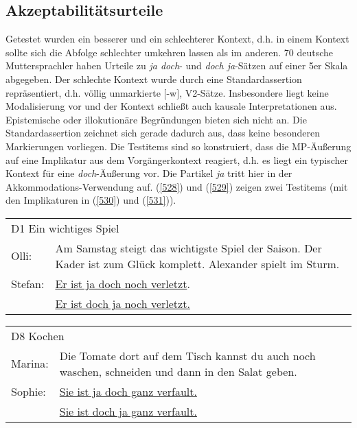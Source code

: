 \subsection{Akzeptabilitätsurteile}
\label{sec:akz}
Getestet wurden ein \glq besserer\grq {} und ein \glq schlechterer\grq {} Kontext, d.h. in einem Kontext sollte sich die Abfolge schlechter umkehren lassen als im anderen. 70 deutsche Muttersprachler haben Urteile zu \textit{ja doch}- und \textit{doch ja}-Sätzen auf einer 5er Skala abgegeben. Der \glq schlechte\grq {} Kontext wurde durch eine Standardassertion  repräsentiert, d.h. völlig unmarkierte $[$-w$]$, V2-Sätze. Insbesondere liegt keine Modalisierung vor und der Kontext schließt auch kausale Interpretationen aus. Epistemische oder illokutionäre Begründungen   bieten sich nicht an. Die Standardassertion zeichnet sich gerade dadurch aus, dass keine besonderen Markierungen vorliegen. Die Testitems sind so konstruiert, dass die MP-Äußerung auf eine Implikatur  aus dem Vorgängerkontext reagiert, d.h. es liegt ein typischer Kontext für eine \textit{doch}-Äußerung vor. Die Partikel \textit{ja} tritt hier in der Akkommoda\-tions-Verwendung  auf. (\ref{528}) und (\ref{529}) zeigen zwei Testitems (mit den Implikaturen in (\ref{530}) und (\ref{531})).

\begin{exe}
	\ex\label{528} 
	\begin{tabular}[t]{p{2em} p{25em}}
	\multicolumn{2}{l}{D1 Ein wichtiges Spiel}\\
    Olli: & Am Samstag steigt das wichtigste Spiel der Saison. Der Kader ist zum Glück komplett. Alexander spielt im Sturm.\\
	Stefan: & \underline{Er ist ja doch noch verletzt}.\\
	& \underline{Er ist doch ja noch verletzt.} \\		
    \end{tabular}
\end{exe}

\begin{exe}
	\ex\label{529} 
	\begin{tabular}[t]{p{3em} p{25em}}
	\multicolumn{2}{l}{D8 Kochen}\\
    Marina: & Die Tomate dort auf dem Tisch kannst du auch noch waschen, schneiden und dann in den Salat geben.\\
	Sophie: & \underline{Sie ist ja doch ganz verfault.}\\
	& \underline{Sie ist doch ja ganz verfault.}\\	
    \end{tabular}
\end{exe}
	

